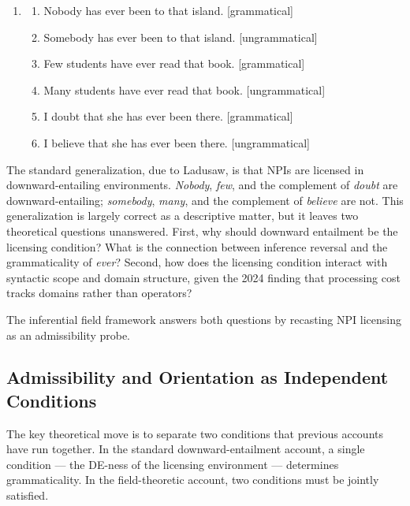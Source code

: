 \documentclass[12pt]{article}
\theoremstyle{remark}
\begin{document}
\begin{enumerate}
\item \label{ex:npi-basic}
\begin{enumerate}
\item[(a)] Nobody has ever been to that island. \hfill [grammatical]
\item[(b)] Somebody has ever been to that island. \hfill
[ungrammatical]
\item[(c)] Few students have ever read that book. \hfill [grammatical]
\item[(d)] Many students have ever read that book. \hfill
[ungrammatical]
\item[(e)] I doubt that she has ever been there. \hfill [grammatical]
\item[(f)] I believe that she has ever been there. \hfill
[ungrammatical]
\end{enumerate}
\end{enumerate}

The standard generalization, due to Ladusaw, is that NPIs are licensed
in downward-entailing environments. \emph{Nobody}, \emph{few}, and the
complement of \emph{doubt} are downward-entailing; \emph{somebody},
\emph{many}, and the complement of \emph{believe} are not. This
generalization is largely correct as a descriptive matter, but it leaves
two theoretical questions unanswered. First, why should downward
entailment be the licensing condition? What is the connection between
inference reversal and the grammaticality of \emph{ever}? Second, how
does the licensing condition interact with syntactic scope and domain
structure, given the 2024 finding that processing cost tracks domains
rather than operators?

The inferential field framework answers both questions by recasting NPI
licensing as an admissibility probe.

\subsection{Admissibility and Orientation as Independent Conditions}

The key theoretical move is to separate two conditions that previous
accounts have run together. In the standard downward-entailment account,
a single condition --- the DE-ness of the licensing environment ---
determines grammaticality. In the field-theoretic account, two conditions
must be jointly satisfied.
\end{document}
